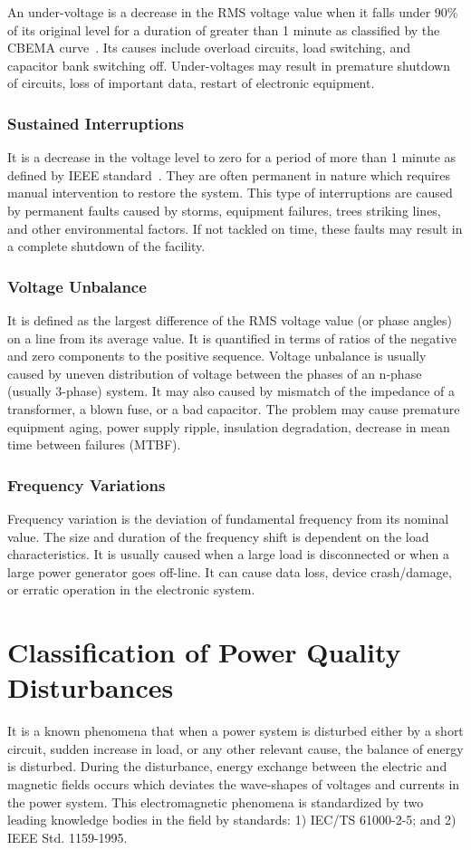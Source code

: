 An under-voltage is a decrease in the RMS voltage value when it falls under 90\% of its original level for a duration of greater than 1 minute as classified by the CBEMA curve~\cite{iti_curve}. Its causes include overload circuits, load switching, and capacitor bank switching off. Under-voltages may result in premature shutdown of circuits, loss of important data, restart of electronic equipment.

\subsubsection{Sustained Interruptions}
It is a decrease in the voltage level to zero for a period of more than 1 minute as defined by IEEE standard~\cite{IEEE09_1159}. They are often permanent in nature which requires manual intervention to restore the system. This type of interruptions are caused by permanent faults caused by storms, equipment failures, trees striking lines, and other environmental factors. If not tackled on time, these faults may result in a complete shutdown of the facility.

\subsubsection{Voltage Unbalance}
It is defined as the largest difference of the RMS voltage value (or phase angles) on a line from its average value. It is quantified in terms of ratios of the negative and zero components to the positive sequence. Voltage unbalance is usually caused by uneven distribution of voltage between the phases of an n-phase (usually 3-phase) system. It may also caused by mismatch of the impedance of a transformer, a blown fuse, or a bad capacitor. The problem may cause premature equipment aging, power supply ripple, insulation degradation, decrease in mean time between failures (MTBF).

\subsubsection{Frequency Variations}
Frequency variation is the deviation of fundamental frequency from its nominal value. The size and duration of the frequency shift is dependent on the load characteristics. It is usually caused when a large load is disconnected or when a large power generator goes off-line. It can cause data loss, device crash/damage, or erratic operation in the electronic system.

\section{Classification of Power Quality Disturbances}
\label{PQclassification}
It is a known phenomena that when a power system is disturbed either by a short circuit, sudden increase in load, or any other relevant cause, the balance of energy is disturbed. During the disturbance, energy exchange between the electric and magnetic fields occurs which deviates the wave-shapes of voltages and currents in the power system. This electromagnetic phenomena is standardized by two leading knowledge bodies in the field by standards: 1) IEC/TS 61000-2-5; and 2) IEEE Std. 1159-1995.

